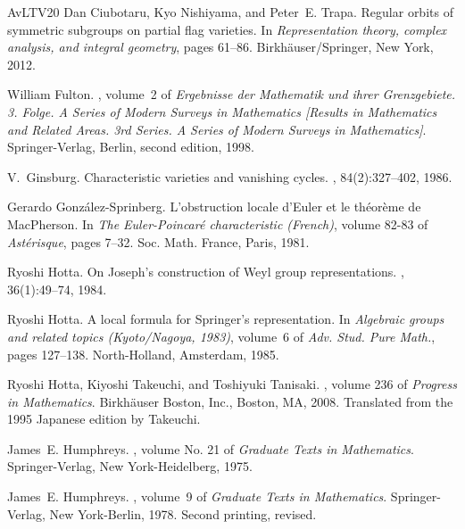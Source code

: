 \documentclass[a4paper, 11pt]{article}
\begin{document}
\begin{thebibliography}{AvLTV20}
Dan Ciubotaru, Kyo Nishiyama, and Peter~E. Trapa.
\newblock Regular orbits of symmetric subgroups on partial flag varieties.
\newblock In {\em Representation theory, complex analysis, and integral
  geometry}, pages 61--86. Birkh\"auser/Springer, New York, 2012.

William Fulton.
, volume~2 of {\em Ergebnisse der Mathematik
  und ihrer Grenzgebiete. 3. Folge. A Series of Modern Surveys in Mathematics
  [Results in Mathematics and Related Areas. 3rd Series. A Series of Modern
  Surveys in Mathematics]}.
\newblock Springer-Verlag, Berlin, second edition, 1998.

V.~Ginsburg.
\newblock Characteristic varieties and vanishing cycles.
, 84(2):327--402, 1986.

Gerardo Gonz\'alez-Sprinberg.
\newblock L'obstruction locale d'{E}uler et le th\'eor\`eme de {M}ac{P}herson.
\newblock In {\em The {E}uler-{P}oincar\'e{} characteristic ({F}rench)}, volume
  82-83 of {\em Ast\'erisque}, pages 7--32. Soc. Math. France, Paris, 1981.

Ryoshi Hotta.
\newblock On {J}oseph's construction of {W}eyl group representations.
, 36(1):49--74, 1984.

Ryoshi Hotta.
\newblock A local formula for {S}pringer's representation.
\newblock In {\em Algebraic groups and related topics ({K}yoto/{N}agoya,
  1983)}, volume~6 of {\em Adv. Stud. Pure Math.}, pages 127--138.
  North-Holland, Amsterdam, 1985.

Ryoshi Hotta, Kiyoshi Takeuchi, and Toshiyuki Tanisaki.
,
  volume 236 of {\em Progress in Mathematics}.
\newblock Birkh\"{a}user Boston, Inc., Boston, MA, 2008.
\newblock Translated from the 1995 Japanese edition by Takeuchi.

James~E. Humphreys.
, volume No. 21 of {\em Graduate Texts
  in Mathematics}.
\newblock Springer-Verlag, New York-Heidelberg, 1975.

James~E. Humphreys.
,
  volume~9 of {\em Graduate Texts in Mathematics}.
\newblock Springer-Verlag, New York-Berlin, 1978.
\newblock Second printing, revised.


\end{thebibliography}
\end{document}
